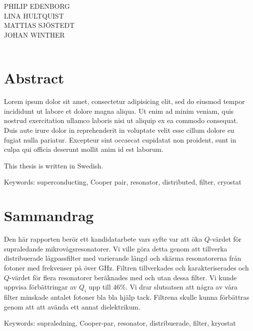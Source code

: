 \documentclass[../../main.tex]{subfiles}
\begin{document}
\titel\\
\undertitel\\
PHILIP EDENBORG\\LINA HULTQUIST\\MATTIAS SJÖSTEDT\\JOHAN WINTHER\\
\department\\
\university \setlength{\parskip}{0.5cm}

\thispagestyle{plain}			%
\setlength{\parskip}{0pt plus 1.0pt}
\section*{Abstract}
Lorem ipsum dolor sit amet, consectetur adipisicing elit, sed do eiusmod tempor incididunt ut labore et dolore magna aliqua. Ut enim ad minim veniam, quis nostrud exercitation ullamco laboris nisi ut aliquip ex ea commodo consequat. Duis aute irure dolor in reprehenderit in voluptate velit esse cillum dolore eu fugiat nulla pariatur. Excepteur sint occaecat cupidatat non proident, sunt in culpa qui officia deserunt mollit anim id est laborum.

This thesis is written in Swedish.

\vfill
Keywords: superconducting, Cooper pair, resonator, distributed, filter, cryostat

\section*{Sammandrag}
Den här rapporten berör ett kandidatarbete vars syfte var att öka $Q$-värdet för supraledande mikrovågsresonatorer. Vi ville göra detta genom att tillverka distribuerade lågpassfilter med varierande längd och skärma resonatorerna från fotoner med frekvenser på över \unit[88]{GHz}. Filtren tillverkades och karakteriserades och $Q$-värdet för flera resonatorer beräknades med och utan dessa filter. Vi kunde uppvisa förbättringar av $Q_i$ upp till $46 \%$. Vi drar slutsatsen att några av våra filter minskade antalet fotoner bla bla hjälp tack. Filtrena skulle kunna förbättras genom att att avända ett annat dielektrikum.

\vfill
Keywords: supraledning, Cooper-par, resonator, distribuerade, filter, kryostat

\newpage\null\thispagestyle{empty}\newpage
\end{document}
